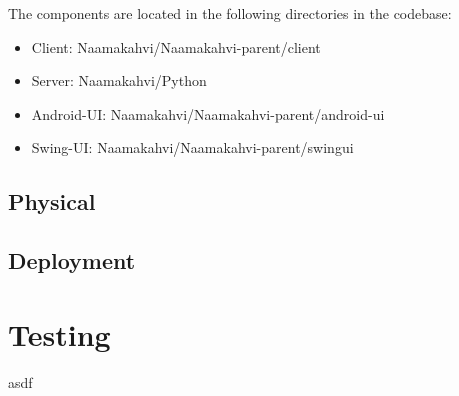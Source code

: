 \documentclass[11pt]{article}
\begin{document}
The components are located in the following directories in the codebase:
\begin{itemize}
\item Client: Naamakahvi/Naamakahvi-parent/client

\item Server: Naamakahvi/Python

\item Android-UI: Naamakahvi/Naamakahvi-parent/android-ui

\item Swing-UI: Naamakahvi/Naamakahvi-parent/swingui
\end{itemize}


\subsection{Physical}

\subsection{Deployment}

\section{Testing}
asdf
\end{document}
